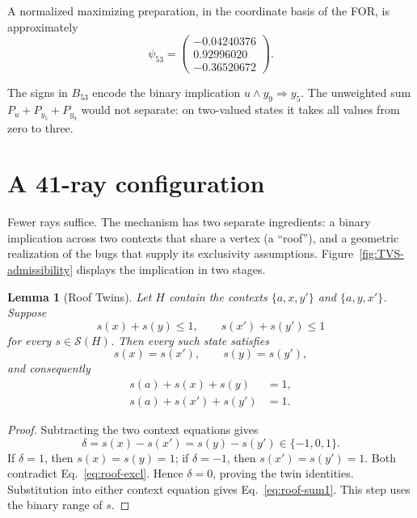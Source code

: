 \documentclass[aps,pra,reprint,superscriptaddress,longbibliography,nofootinbib,floatfix,10pt]{revtex4-2}
\newtheorem{lemma}[theorem]{Lemma}
\theoremstyle{definition}\newtheorem{definition}[theorem]{Definition}
\theoremstyle{remark}\newtheorem{remark}[theorem]{Remark}
\newcommand{\Sc}{\mathcal S}\newcommand{\Cc}{\mathcal C}\newcommand{\Wc}{\mathcal W}
\begin{document}
A normalized maximizing preparation, in the coordinate basis of the FOR, is approximately
\begin{equation}\label{eq:H53-weighted-facet-state}
\psi_{53}=\begin{pmatrix}-0.04240376\\0.92996020\\-0.36520672\end{pmatrix}.
\end{equation}

The signs in $B_{53}$ encode the binary implication $u\wedge y_9\Rightarrow y_5$. The unweighted sum $P_u+P_{y_5}+P_{y_9}$ would not separate: on two-valued states it takes all values from zero to three.

\section{A 41-ray configuration}\label{sec:tvs-admissibility}
Fewer rays suffice. The mechanism has two separate ingredients: a binary implication across two contexts that share a vertex (a ``roof''), and a geometric realization of the bugs that supply its exclusivity assumptions. Figure~\ref{fig:TVS-admissibility} displays the implication in two stages.

\begin{lemma}[Roof Twins]\label{lem:roof-twin}
Let $H$ contain the contexts $\{a,x,y'\}$ and $\{a,y,x'\}$. Suppose
\begin{equation}\label{eq:roof-excl}
s(x)+s(y)\le1,\qquad s(x')+s(y')\le1
\end{equation}
for every $s\in\Sc(H)$. Then every such state satisfies
\begin{equation}\label{eq:roof-twins}
s(x)=s(x'),\qquad s(y)=s(y'),
\end{equation}
and consequently
\begin{equation}\label{eq:roof-sum1}
\begin{aligned}
s(a)+s(x)+s(y)&=1,\\
s(a)+s(x')+s(y')&=1.
\end{aligned}
\end{equation}
\end{lemma}
\begin{proof}
Subtracting the two context equations gives
\[
\delta=s(x)-s(x')=s(y)-s(y')\in\{-1,0,1\}.
\]
If $\delta=1$, then $s(x)=s(y)=1$; if $\delta=-1$, then $s(x')=s(y')=1$. Both contradict Eq.~\eqref{eq:roof-excl}. Hence $\delta=0$, proving the twin identities. Substitution into either context equation gives Eq.~\eqref{eq:roof-sum1}. This step uses the binary range of $s$.
\end{proof}
\end{document}
